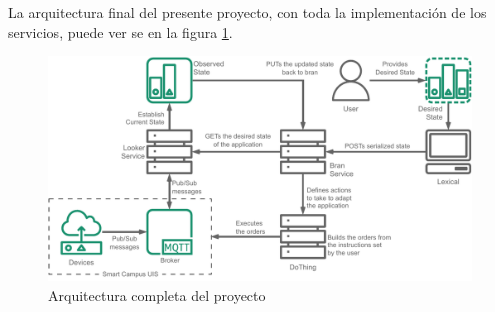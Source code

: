La arquitectura final del presente proyecto, con toda la implementación de los servicios, puede ver se en la figura \ref{fig:StarDuckFinal}.


\begin{figure}[ht]
    \centering
    \caption{Arquitectura completa del proyecto}
    \label{fig:StarDuckFinal}
    \includegraphics[width=\linewidth]{images/StarDuckFinal.pdf}
\end{figure}